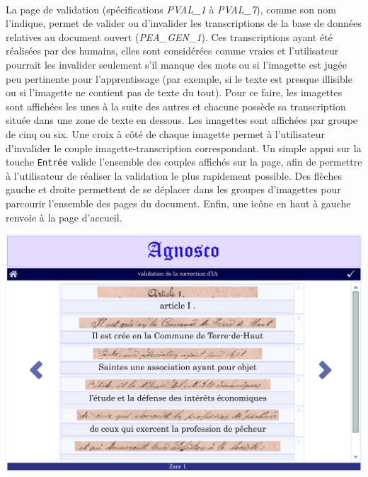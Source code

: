 \paragraph{}
La page de validation (spécifications \textit{PVAL\_1} à \textit{PVAL\_7}), comme son nom l’indique, permet de valider ou d’invalider les transcriptions de la base de données relatives au document ouvert (\textit{PEA\_GEN\_1}). Ces transcriptions ayant été réalisées par des humains, elles sont considérées comme vraies et l’utilisateur pourrait les invalider seulement s’il manque des mots ou si l’imagette est jugée peu pertinente pour l’apprentissage (par exemple, si le texte est presque illisible ou si l’imagette ne contient pas de texte du tout).
\newline{}
Pour ce faire, les imagettes sont affichées les unes à la suite des autres et chacune possède sa transcription située dans une zone de texte en dessous. Les imagettes sont affichées par groupe de cinq ou six. Une croix à côté de chaque imagette permet à l’utilisateur d’invalider le couple imagette-transcription correspondant. Un simple appui sur la touche \texttt{Entrée} valide l’ensemble des couples affichés sur la page, afin de permettre à l’utilisateur de réaliser la validation le plus rapidement possible. Des flèches gauche et droite permettent de se déplacer dans les groupes d’imagettes pour parcourir l’ensemble des pages du document. Enfin, une icône en haut à gauche renvoie à la page d’accueil.

\begin{mdframed}[frametitle={Figure 2 : Maquette de la page de validation des annotations}, innerbottommargin=10]
\begin{center}
\includegraphics[scale=0.04]{assets/maquetteIHMvalidation1.jpg}
\end{center}
\end{mdframed}

